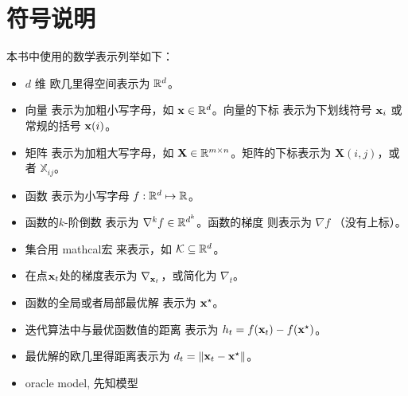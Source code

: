 \chapter*{
    符号说明
    }

本书中使用的数学表示列举如下：
\begin{itemize}
\item
$d$ 维 欧几里得空间表示为 ${\mathbb R}^d$。
\item
向量 表示为加粗小写字母，如 $\mathbf x \in {\mathbb R}^d$。向量的下标 表示为下划线符号 $\mathbf x_i$ 或常规的括号 $\mathbf x(i)$。
\item
矩阵 表示为加粗大写字母，如 $\mathbf{X}  \in {\mathbb R}^{m \times n}$。矩阵的下标表示为 $\mathbf{X}(i,j)$，或者 $\mathbb{X}_{ij}$。
\item
函数 表示为小写字母 $f: {\mathbb R}^d \mapsto {\mathbb R}$。
\item 
函数的$k$-阶倒数 表示为 $\nabla^k f \in {\mathbb R}^{d^k}$。函数的梯度 则表示为 $\nabla f$ （没有上标）。
\item
集合用 mathcal宏 来表示，如 $\mathcal K \subseteq {\mathbb R}^d$。
\item
在点$\mathbf x_t$处的梯度表示为 $\nabla_{\mathbf x_t}$，或简化为 $\nabla_t$。
\item
函数的全局或者局部最优解 表示为 $\mathbf x^\star$。
\item
迭代算法中与最优函数值的距离 表示为 $h_t = f(\mathbf x_t) - f(\mathbf x^\star)$。
\item
最优解的欧几里得距离表示为 $d_t = \|\mathbf x_t - \mathbf x^\star\| $。
\item 
oracle model, 先知模型
\end{itemize}
